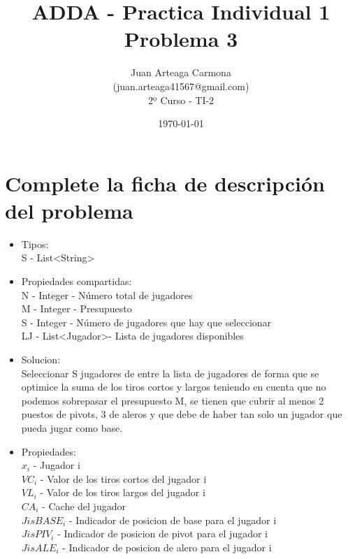 \documentclass[a4paper,12pt]{article}
\title{ADDA - Practica Individual 1\\ Problema 3}
\author{Juan Arteaga Carmona\\(juan.arteaga41567@gmail.com)\\2º Curso - TI-2}
\date{\today}
\begin{document}
\maketitle

\section{Complete la ficha de descripción del problema}


\begin{itemize}
 \item Tipos:\\
 S - List\textless String\textgreater \\%

 \item Propiedades compartidas:\\
 N - Integer - Número total de jugadores\\
 M - Integer - Presupuesto\\
 S - Integer - Número de jugadores que hay que seleccionar\\
 LJ - List\textless Jugador\textgreater - Lista de jugadores disponibles\\

 \item Solucion:\\
Seleccionar S jugadores de entre la lista de jugadores de forma que se optimice
la suma de los tiros cortos y largos teniendo en cuenta que no podemos sobrepasar el presupuesto M, se tienen que cubrir
 al menos 2 puestos de pivots, 3 de aleros y que debe de haber tan solo un jugador
 que pueda jugar como base.

\item Propiedades:\\
$ x_i $ - Jugador i\\
$VC_i$ - Valor de los tiros cortos del jugador i\\
$ VL_i $ - Valor de los tiros largos del jugador i\\
$ CA_i $ - Cache del jugador\\
$ JisBASE_i $ - Indicador de posicion de base para el jugador i\\
$ JisPIV_i $ - Indicador de posicion de pivot para el jugador i\\
$ JisALE_i $ - Indicador de posicion de alero para el jugador i\\



\end{itemize}
\end{document}
